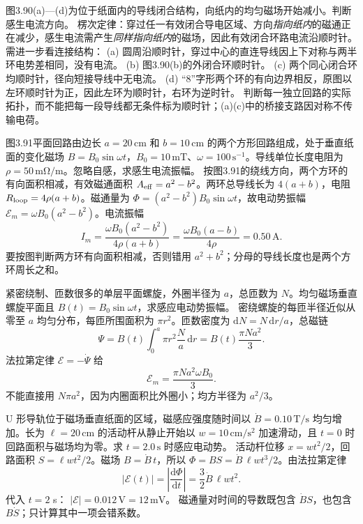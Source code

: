 图3.90(a)—(d)为位于纸面内的导线闭合结构，向纸内的均匀磁场开始减小。判断感生电流方向。
\exsolution
楞次定律：穿过任一有效闭合导电区域、方向\emph{指向纸内}的磁通正在减少，感生电流需产生\emph{同样指向纸内}的磁场，因此有效闭合环路电流沿顺时针。需进一步看连接结构：
(a) 圆周沿顺时针，穿过中心的直连导线因上下对称与两半环电势差相同，没有电流。
(b) 图3.90(b)的外闭合环顺时针。
(c) 两个同心闭合环均顺时针，径向短接导线中无电流。
(d) “8”字形两个环的有向边界相反，原图以左环顺时针为正，因此左环为顺时针，右环为逆时针。
\excheck 判断每一独立回路的实际拓扑，而不能把每一段导线都无条件标为顺时针；(a)(c)中的桥接支路因对称不传输电荷。

图3.91平面回路由边长 $a=20\,\mathrm{cm}$ 和 $b=10\,\mathrm{cm}$ 的两个方形回路组成，处于垂直纸面的变化磁场 $B=B_0\sin\omega t$，$B_0=10\,\mathrm{mT}$、$\omega=100\,\mathrm{s^{-1}}$。导线单位长度电阻为 $\rho=50\,\mathrm{m\Omega/m}$。忽略自感，求感生电流振幅。
\exsolution
按图3.91的绕线方向，两个方环的有向面积相减，有效磁通面积 $A_{\rm eff}=a^2-b^2$。两环总导线长为 $4(a+b)$，电阻 $R_{\rm loop}=4\rho(a+b)$。磁通量为 $\Phi=(a^2-b^2)B_0\sin\omega t$，故电动势振幅
$\mathcal E_m=\omega B_0(a^2-b^2)$。电流振幅
\[
\boxed{I_m=\frac{\omega B_0(a^2-b^2)}{4\rho(a+b)}
=\frac{\omega B_0(a-b)}{4\rho}
=0.50\,\mathrm A}.
\]
\excheck 要按图判断两方环有向面积相减，否则错用 $a^2+b^2$；分母的导线长度也是两个方环周长之和。

紧密绕制、匝数很多的单层平面螺旋，外圈半径为 $a$，总匝数为 $N$。均匀磁场垂直螺旋平面且 $B(t)=B_0\sin\omega t$，求感应电动势振幅。
\exsolution
密绕螺旋的每匝半径近似从零至 $a$ 均匀分布，每匝所围面积为 $\pi r^2$。匝数密度为 $\mathrm dN=N\,\mathrm dr/a$，总磁链
\[
\Psi=B(t)\int_0^a\pi r^2\frac Na\,\mathrm dr
=B(t)\frac{\pi Na^2}{3}.
\]
法拉第定律 $\mathcal E=-\dot\Psi$ 给
\[
\boxed{\mathcal E_m=\frac{\pi Na^2\omega B_0}{3}}.
\]
\excheck 不能直接用 $N\pi a^2$，因为内圈面积比外圈小；均方半径为 $a^2/3$。

U 形导轨位于磁场垂直纸面的区域，磁感应强度随时间以 $\dot B=0.10\,\mathrm{T/s}$ 均匀增加。长为 $\ell=20\,\mathrm{cm}$ 的活动杆从静止开始以 $w=10\,\mathrm{cm/s^2}$ 加速滑动，且 $t=0$ 时回路面积与磁场均为零。求 $t=2.0\,\mathrm s$ 时感应电动势。
\exsolution
活动杆位移 $x=wt^2/2$，回路面积 $S=\ell wt^2/2$。磁场 $B=\dot B\,t$，所以
$\Phi=BS=\dot B\,\ell w t^3/2$。由法拉第定律
\[
\boxed{|\mathcal E(t)|=\left|\frac{\mathrm d\Phi}{\mathrm dt}\right|
=\frac32\dot B\,\ell w t^2}.
\]
代入 $t=2$ s：
$\boxed{|\mathcal E|=0.012\,\mathrm V=12\,\mathrm{mV}}$。
\excheck 磁通量对时间的导数既包含 $\dot B S$，也包含 $B\dot S$；只计算其中一项会错系数。

